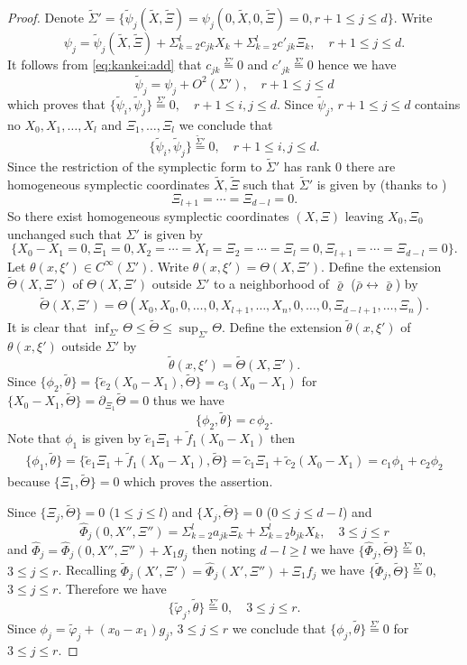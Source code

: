 \documentclass[12pt,leqno]{article} %
\def\dif{\partial}
\def\sieq{\overset{\Sigma'}{=}}
\def\bro{\bar\rho}
\def\bro{\bar\rho}
\numberwithin{equation}{section}
\begin{document}
\begin{proof}
%
%
Denote $\tilde\Sigma'=\{\tilde\psi_j(\tilde X,\tilde\Xi)=\psi_j(0,\tilde X,0,\tilde\Xi)=0, r+1\leq j\leq d\}$. Write
%
\[
\psi_j=\tilde\psi_j(\tilde X,\tilde\Xi)+\Sigma_{k=2}^lc_{jk}X_k+\Sigma_{k=2}^lc'_{jk}\Xi_k,\quad r+1\leq j\leq d.
\]
%
It follows from \eqref{eq:kankei:add} that $c_{jk}\sieq 0$ and $c'_{jk}\sieq 0$ hence we have
%
\[
\tilde\psi_j=\psi_j+O^2(\Sigma'),\quad r+1\leq j\leq d
\]
%
which proves that $\{\tilde\psi_i,\tilde\psi_j\}\sieq 0,\quad r+1\leq i,j\leq d$. Since $\tilde\psi_j$, $r+1\leq j\leq d$ contains no $X_0,X_1,\ldots,X_l$ and $\Xi_1,\ldots,\Xi_l$ we conclude that
%
\[
\{\tilde\psi_i,\tilde\psi_j\}{\overset{\tilde\Sigma'}{=}} 0,\quad r+1\leq i,j\leq d.
\]
%
Since the restriction of the symplectic form to $\tilde\Sigma'$ has rank $0$  there are homogeneous symplectic coordinates $\tilde X, \tilde\Xi$ such that $\tilde\Sigma'$ is given by (thanks to \cite[Theorem 21.2.4]{MR781536})
%
\[
\Xi_{l+1}=\cdots=\Xi_{d-l}=0.
\]
%
So there exist homogeneous symplectic coordinates $(X,\Xi)$ leaving $X_0, \Xi_0$ unchanged such that $\Sigma'$ is given by
%
\[
\{X_0-X_1=0,\Xi_1=0, X_2=\cdots=X_l=\Xi_2=\cdots=\Xi_l=0, \Xi_{l+1}=\cdots=\Xi_{d-l}=0\}.
\]
%
Let $\theta(x,\xi')\in C^{\infty}(\Sigma')$. Write $\theta(x,\xi')=\Theta(X,\Xi')$. Define the extension $\tilde\Theta(X,\Xi')$ of $\Theta(X,\Xi')$ outside $\Sigma'$ to a neighborhood of $\bar\varrho$ ($\bro\leftrightarrow \bar\varrho$) by
%
\begin{gather*}
\tilde\Theta(X,\Xi')=\Theta(X_0,X_0,0,\ldots,0, X_{l+1},\dots,X_n,0,\ldots,0,\Xi_{d-l+1},\ldots, \Xi_n).
\end{gather*}
%
It is clear that $\inf_{\Sigma'}\Theta\leq \tilde\Theta\leq \sup_{\Sigma'}\Theta$. Define the extension $\tilde\theta(x,\xi')$ of $\theta(x,\xi')$ outside $\Sigma'$ by
%
\[
\tilde\theta(x,\xi')=\tilde\Theta(X,\Xi').
\]
%
Since $\{\phi_2,\tilde\theta\}=\{\tilde e_2(X_0-X_1), \tilde \Theta\}=c_3(X_0-X_1)$ for $\{X_0-X_1,\tilde\Theta\}=\dif_{\Xi_1}\tilde\Theta=0$
thus we have
%
\[
\{\phi_2, \tilde\theta\}=c\,\phi_2.
\]
%
Note that $\phi_1$ is given by $\tilde e_1\Xi_1+\tilde f_1(X_0-X_1)$ then
%
\begin{gather*}
\{\phi_1,\tilde\theta\}=\{\tilde e_1\Xi_1+\tilde f_1(X_0-X_1), \tilde\Theta\}=\tilde c_1\Xi_1+\tilde c_2(X_0-X_1)=c_1\phi_1+c_2\phi_2
\end{gather*}
%
because $\{\Xi_1,\tilde\Theta\}=0$ which proves the assertion. 

Since $\{\Xi_j,\tilde\Theta\}=0$ ($1\leq j\leq l$) and $\{X_j,\tilde\Theta\}=0$ ($0\leq j\leq d-l$) and
%
\[
\hat\Phi_j(0,X'',\Xi'')=\Sigma_{k=2}^{l}a_{jk}\Xi_k+\Sigma_{k=2}^lb_{jk}X_k,\quad 3\leq j\leq r
\]
%
and $\hat\Phi_j=\hat\Phi_j(0,X'',\Xi'')+X_1g_j$ then noting $d-l\geq l$ we have $
\{\hat\Phi_j,\tilde\Theta\}\sieq 0$, $3\leq j\leq r$. 
Recalling $\tilde\Phi_j(X',\Xi')=\hat\Phi_j(X', \Xi'')+\Xi_1f_j$ we have $\{\tilde\Phi_j,\tilde\Theta\}\sieq 0$, $3\leq j\leq r$. Therefore we have
%
\[
\{\tilde\varphi_j,\tilde\theta\}\sieq 0,\quad 3\leq j\leq r.
\]
%
Since $\phi_j=\tilde\varphi_j+(x_0-x_1)g_j$, $3\leq j\leq r$ we conclude that $\{\phi_j,\tilde\theta\}\sieq 0$ for $3\leq j\leq r$. 
\end{proof}
\end{document}

